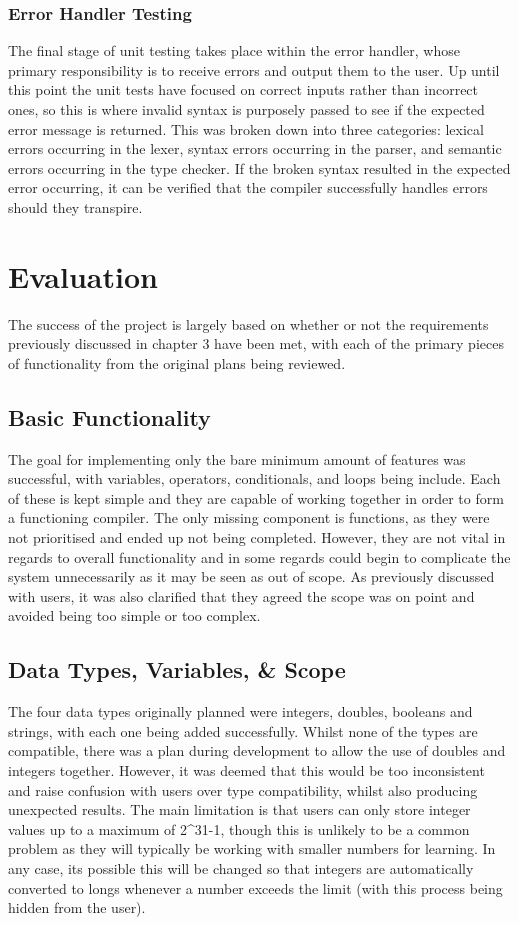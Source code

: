 \documentclass[
]{report}
\begin{document}
\subsection{Error Handler Testing}
The final stage of unit testing takes place within the error handler,
whose primary responsibility is to receive errors and output them to the
user. Up until this point the unit tests have focused on correct inputs
rather than incorrect ones, so this is where invalid syntax is purposely
passed to see if the expected error message is returned. This was broken
down into three categories: lexical errors occurring in the lexer,
syntax errors occurring in the parser, and semantic errors occurring in
the type checker. If the broken syntax resulted in the expected error
occurring, it can be verified that the compiler successfully handles
errors should they transpire.

\chapter{Evaluation}
The success of the project is largely based on whether or not the
requirements previously discussed in chapter 3 have been met, with each
of the primary pieces of functionality from the original plans being
reviewed.

\section{Basic Functionality}
The goal for implementing only the bare minimum amount of features was
successful, with variables, operators, conditionals, and loops being
include. Each of these is kept simple and they are capable of working
together in order to form a functioning compiler. The only missing
component is functions, as they were not prioritised and ended up not
being completed. However, they are not vital in regards to overall
functionality and in some regards could begin to complicate the system
unnecessarily as it may be seen as out of scope. As previously discussed
with users, it was also clarified that they agreed the scope was on
point and avoided being too simple or too complex.

\section{Data Types, Variables, \& Scope}
The four data types originally planned were integers, doubles, booleans
and strings, with each one being added successfully. Whilst none of the
types are compatible, there was a plan during development to allow the
use of doubles and integers together. However, it was deemed that this
would be too inconsistent and raise confusion with users over type
compatibility, whilst also producing unexpected results. The main
limitation is that users can only store integer values up to a maximum
of 2\^{}31-1, though this is unlikely to be a common problem as they
will typically be working with smaller numbers for learning. In any
case, its possible this will be changed so that integers are
automatically converted to longs whenever a number exceeds the limit
(with this process being hidden from the user).
\end{document}
